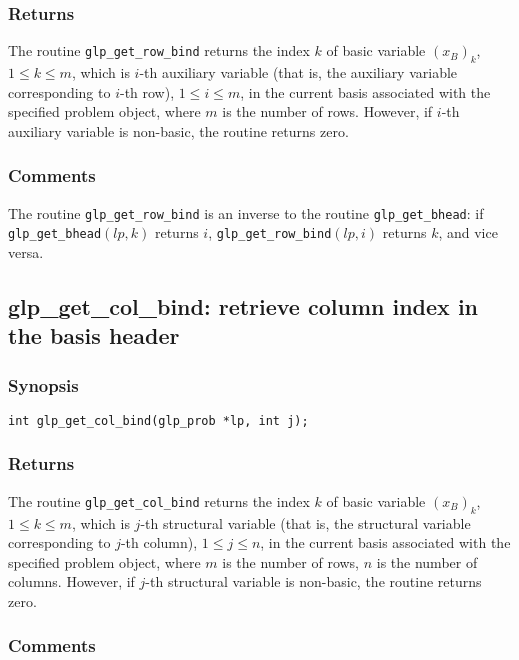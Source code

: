 \subsubsection*{Returns}

The routine \verb|glp_get_row_bind| returns the index $k$ of basic
variable $(x_B)_k$, $1\leq k\leq m$, which is $i$-th auxiliary variable
(that is, the auxiliary variable corresponding to $i$-th row),
$1\leq i\leq m$, in the current basis associated with the specified
problem object, where $m$ is the number of rows. However, if $i$-th
auxiliary variable is non-basic, the routine returns zero.

\subsubsection*{Comments}

The routine \verb|glp_get_row_bind| is an inverse to the routine
\verb|glp_get_bhead|: if \verb|glp_get_bhead|$(lp,k)$ returns $i$,
\verb|glp_get_row_bind|$(lp,i)$ returns $k$, and vice versa.

\subsection{glp\_get\_col\_bind: retrieve column index in the basis
header}

\subsubsection*{Synopsis}

\begin{verbatim}
int glp_get_col_bind(glp_prob *lp, int j);
\end{verbatim}

\subsubsection*{Returns}

The routine \verb|glp_get_col_bind| returns the index $k$ of basic
variable $(x_B)_k$, $1\leq k\leq m$, which is $j$-th structural
variable (that is, the structural variable corresponding to $j$-th
column), $1\leq j\leq n$, in the current basis associated with the
specified problem object, where $m$ is the number of rows, $n$ is the
number of columns. However, if $j$-th structural variable is non-basic,
the routine returns zero.

\subsubsection*{Comments}

